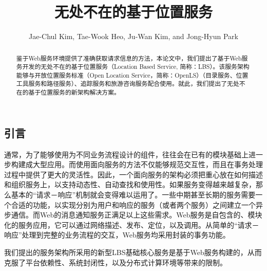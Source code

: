 \documentclass{article}
\title{无处不在的基于位置服务}
\author{Jae-Chul Kim, Tae-Wook Heo, Ju-Wan Kim, and Jong-Hyun Park}
\begin{document}
\begin{CJK}{UTF8}{gbsn}
  \maketitle

  \renewcommand{\abstractname}{摘要}
	\renewcommand{\figurename}{图}
	\renewcommand{\refname}{参考文献}

	

  \begin{abstract}
	鉴于Web服务环境提供了准确获取请求信息的方法，本论文中，我们提出了基于Web服务开发的无处不在的基于位置服务（Location Based Service, 简称：LBS）。该服务架构能够与开放位置服务标准（Open Location Service，简称：OpenLS）（目录服务、位置工具服务和路径服务）、追踪服务和旅游咨询服务配合使用。就此，我们提出了无处不在的基于位置服务的新架构解决方案。
  \end{abstract}

  \newpage
  \section{引言}
	通常，为了能够使用为不同业务流程设计的组件，往往会在已有的模块基础上进一步构建成大型应用。而使用面向服务的方法不仅能够规范交互性，而且在事务处理过程中提供了更大的灵活性。因此，一个面向服务的架构必须把重心放在如何描述和组织服务上，以支持动态性、自动查找和使用性。如果服务变得越来越复杂，那么基本的“请求－响应”机制就会变得难以运用了。一些中期甚至长期的服务需要一个合适的功能，以实现分别为用户和响应的服务（或者两个服务）之间建立一个异步通信\cite{LimWen}。而Web的消息通知服务正满足以上这些需求。Web服务是自包含的、模块化的服务应用，它可以通过网络描述、发布、定位，以及调用。从简单的“请求－响应”处理到完整的业务流程的交互，Web服务均采用封装的事务功能\cite{ScottBenRomin}。

	我们提出的服务架构所采用的新型LBS基础核心服务是基于Web服务构建的，从而克服了平台依赖性、系统封闭性，以及分布式计算环境等带来的限制。



\end{CJK}
\end{document}
